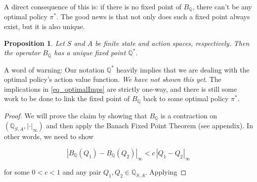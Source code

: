 \documentclass[11pt]{article} %
\newtheorem{prop}{Proposition}
\begin{document}
A direct consequence of this is: if there is no fixed point of $B_{\mathbb{Q}}$, there can't be any optimal policy $\pi^*$. The good news is that not only does such a fixed point always exist, but it is also unique.

\begin{prop}
	Let $S$ and $A$ be finite state and action spaces, respectively. Then the operator $B_{\mathbb{Q}}$ has a unique fixed point $\mathbb{Q^*}$.
\end{prop}

A word of warning: Our notation $\mathbb{Q^*}$ heavily implies that we are dealing with the optimal policy's action value function. \textit{We have not shown this yet}. The implications in \ref{eq_optimalImps} are strictly one-way, and there is still some work to be done to link the fixed point of $B_{\mathbb{Q}}$ back to some optimal policy $\pi^*$.

\begin{proof}
	We will prove the claim by showing that $B_{\mathbb{Q}}$ is a contraction on $(\mathbb{Q}_{S,A},|\cdot|_{\infty})$ and then apply the Banach Fixed Point Theorem (see appendix). In other words, we need to show 

\begin{equation}
	|B_{\mathbb{Q}}(Q_1) - B_{\mathbb{Q}}(Q_2)|_{\infty} < c \, |Q_1 - Q_2|_{\infty}
\end{equation}

for some $0 < c <1$ and any pair $Q_1,Q_2 \in \mathbb{Q}_{S,A}$. Applying 
\end{proof}
\end{document}
